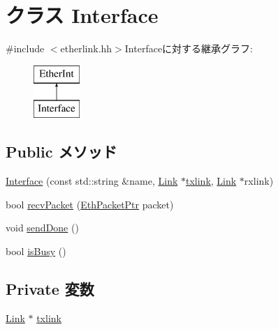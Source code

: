 \hypertarget{classEtherLink_1_1Interface}{
\section{クラス Interface}
\label{classEtherLink_1_1Interface}
}


{\ttfamily \#include $<$etherlink.hh$>$}Interfaceに対する継承グラフ:\begin{figure}[H]
\begin{center}
\leavevmode
\includegraphics[height=2cm]{classEtherLink_1_1Interface}
\end{center}
\end{figure}
\subsection*{Public メソッド}
\begin{DoxyCompactItemize}
\item 
\hyperlink{classEtherLink_1_1Interface_ac65fdcafd3edde87ea220afaf9ab4fee}{Interface} (const std::string \&name, \hyperlink{classEtherLink_1_1Link}{Link} $\ast$\hyperlink{classEtherLink_1_1Interface_aeae29843b3b3a523bfc7a2d85563d63b}{txlink}, \hyperlink{classEtherLink_1_1Link}{Link} $\ast$rxlink)
\item 
bool \hyperlink{classEtherLink_1_1Interface_ad54e71348f53dfb5444979e9bfaf3164}{recvPacket} (\hyperlink{classRefCountingPtr}{EthPacketPtr} packet)
\item 
void \hyperlink{classEtherLink_1_1Interface_aa1f5a3f61e2513049769a9ca8b16ea2d}{sendDone} ()
\item 
bool \hyperlink{classEtherLink_1_1Interface_a108b650255e1fff7409a075681e6f46b}{isBusy} ()
\end{DoxyCompactItemize}
\subsection*{Private 変数}
\begin{DoxyCompactItemize}
\item 
\hyperlink{classEtherLink_1_1Link}{Link} $\ast$ \hyperlink{classEtherLink_1_1Interface_aeae29843b3b3a523bfc7a2d85563d63b}{txlink}
\end{DoxyCompactItemize}


